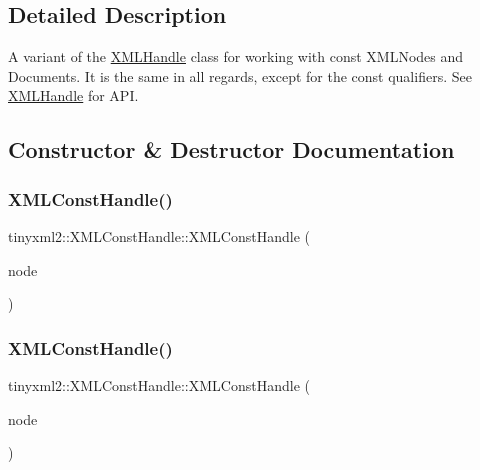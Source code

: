 \subsection{Detailed Description}
A variant of the \mbox{\hyperlink{classtinyxml2_1_1_x_m_l_handle}{X\+M\+L\+Handle}} class for working with const X\+M\+L\+Nodes and Documents. It is the same in all regards, except for the \textquotesingle{}const\textquotesingle{} qualifiers. See \mbox{\hyperlink{classtinyxml2_1_1_x_m_l_handle}{X\+M\+L\+Handle}} for A\+PI. 

\subsection{Constructor \& Destructor Documentation}
\mbox{\label{classtinyxml2_1_1_x_m_l_const_handle_a098bda71fa11d7c74ccddab59d5dd534}} 
\subsubsection{\texorpdfstring{X\+M\+L\+Const\+Handle()}{XMLConstHandle()}\hspace{0.1cm}{\footnotesize\ttfamily [1/3]}}
{\footnotesize\ttfamily tinyxml2\+::\+X\+M\+L\+Const\+Handle\+::\+X\+M\+L\+Const\+Handle (\begin{DoxyParamCaption}\item[{const \mbox{\hyperlink{classtinyxml2_1_1_x_m_l_node}{X\+M\+L\+Node}} $\ast$}]{node }\end{DoxyParamCaption})\hspace{0.3cm}{\ttfamily [inline]}}

\mbox{\label{classtinyxml2_1_1_x_m_l_const_handle_a8420a0c4720637e0529e78c2e22f2b0b}} 
\subsubsection{\texorpdfstring{X\+M\+L\+Const\+Handle()}{XMLConstHandle()}\hspace{0.1cm}{\footnotesize\ttfamily [2/3]}}
{\footnotesize\ttfamily tinyxml2\+::\+X\+M\+L\+Const\+Handle\+::\+X\+M\+L\+Const\+Handle (\begin{DoxyParamCaption}\item[{const \mbox{\hyperlink{classtinyxml2_1_1_x_m_l_node}{X\+M\+L\+Node}} \&}]{node }\end{DoxyParamCaption})\hspace{0.3cm}{\ttfamily [inline]}}

